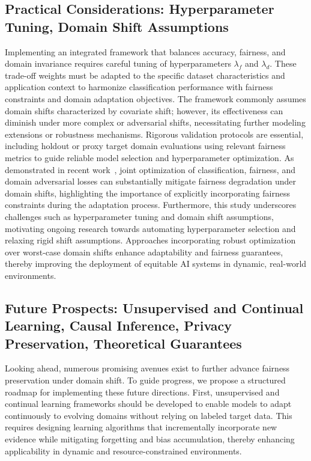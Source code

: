 \documentclass[sigconf]{acmart}
\begin{document}
\subsection{Practical Considerations: Hyperparameter Tuning, Domain Shift Assumptions}

Implementing an integrated framework that balances accuracy, fairness, and domain invariance requires careful tuning of hyperparameters \(\lambda_f\) and \(\lambda_d\). These trade-off weights must be adapted to the specific dataset characteristics and application context to harmonize classification performance with fairness constraints and domain adaptation objectives. The framework commonly assumes domain shifts characterized by covariate shift; however, its effectiveness can diminish under more complex or adversarial shifts, necessitating further modeling extensions or robustness mechanisms. Rigorous validation protocols are essential, including holdout or proxy target domain evaluations using relevant fairness metrics to guide reliable model selection and hyperparameter optimization. As demonstrated in recent work~\cite{ref26}, joint optimization of classification, fairness, and domain adversarial losses can substantially mitigate fairness degradation under domain shifts, highlighting the importance of explicitly incorporating fairness constraints during the adaptation process. Furthermore, this study underscores challenges such as hyperparameter tuning and domain shift assumptions, motivating ongoing research towards automating hyperparameter selection and relaxing rigid shift assumptions. Approaches incorporating robust optimization over worst-case domain shifts enhance adaptability and fairness guarantees, thereby improving the deployment of equitable AI systems in dynamic, real-world environments.

\subsection{Future Prospects: Unsupervised and Continual Learning, Causal Inference, Privacy Preservation, Theoretical Guarantees}

Looking ahead, numerous promising avenues exist to further advance fairness preservation under domain shift. To guide progress, we propose a structured roadmap for implementing these future directions. First, unsupervised and continual learning frameworks should be developed to enable models to adapt continuously to evolving domains without relying on labeled target data. This requires designing learning algorithms that incrementally incorporate new evidence while mitigating forgetting and bias accumulation, thereby enhancing applicability in dynamic and resource-constrained environments.
\end{document}
